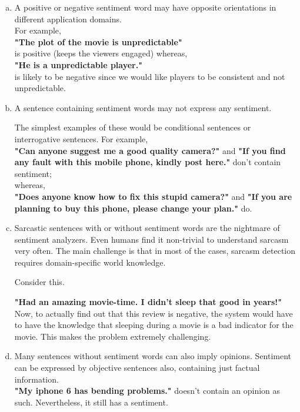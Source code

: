 \begin{enumerate}[(a)]
\setlength{\itemsep}{15pt}

\item A positive or negative sentiment word may have opposite orientations in
different application domains. \\ For example, \\

\textbf{"The plot of the movie is unpredictable"} \vspace{8mm} \\ is positive (keeps the viewers engaged) whereas,  \vspace{8mm} \\
\textbf{"He is a unpredictable player."}  \vspace{8mm} \\
is likely to be negative since we would like players to be consistent and not unpredictable.

\item A sentence containing sentiment words may not express any sentiment.

The simplest examples of these would be conditional sentences or interrogative sentences. For example, \vspace{8mm} \\

\textbf{"Can anyone suggest me a good quality camera?"} and \textbf{"If you find any fault with this mobile phone, kindly post here."} don't contain sentiment; \vspace{8mm} \\
whereas, \vspace{8mm} \\
\textbf{"Does anyone know how to fix this stupid camera?"} and \textbf{"If you are planning to buy this phone, please change your plan."} do.

\item Sarcastic sentences with or without sentiment words are the nightmare of sentiment analyzers. Even humans find it non-trivial to understand sarcasm very often.
The main challenge is that in most of the cases, sarcasm detection requires domain-specific world knowledge. \vspace{8mm}

Consider this. \vspace{8mm}

\textbf{"Had an amazing movie-time. I didn't sleep that good in years!"} \\ Now, to actually find out that this review is negative, the system would have to have the knowledge that sleeping during a movie is a bad indicator for the movie. This makes the problem 
extremely challenging.

\item Many sentences without sentiment words can also imply opinions. Sentiment can be expressed by objective sentences also, containing just factual information. \vspace{8mm} \\ \textbf{"My iphone 6 has bending problems."} doesn't contain an opinion as such. Nevertheless, it still has a sentiment.

\end{enumerate}


